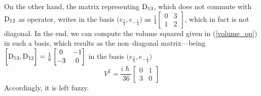 On the other hand, the matrix representing $\text{\normalfont D}_{13}$, which does not commute with $\text{\normalfont D}_{12}$ as operator, writes in the basis $\bigg(e_{\frac{3}{4}},e_{-\frac{1}{4}}\bigg)$ as %
$\frac{1}{4}\begin{bmatrix}
    0&3\\1&2
\end{bmatrix}$, which in fact is not diagonal. In the end, we can compute the volume squared given in (\ref{volume_op}) in such a basis, which results as the non--diagonal matrix---being $\bigg[\text{\normalfont D}_{13},\text{\normalfont D}_{12}\bigg]=\frac{1}{8}\begin{bmatrix}
   0&-1\\
   -3&0
\end{bmatrix}$ in the basis $\bigg(e_{\frac{3}{4}},e_{-\frac{1}{4}}\bigg)$ %
$$V^2=\frac{i\hslash}{36}\begin{bmatrix}
    0&1\\
    3&0
\end{bmatrix}$$
Accordingly, it is left fuzzy.

